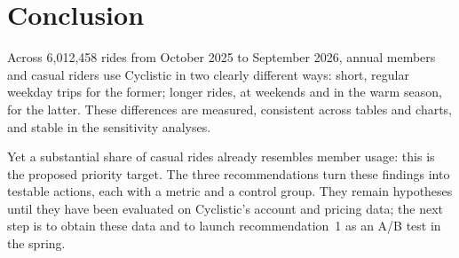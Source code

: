 \section{Conclusion}
\label{sec:conclusion}

Across 6,012,458 rides from October 2025 to September 2026, annual members and casual riders use Cyclistic in two clearly different ways: short, regular weekday trips for the former; longer rides, at weekends and in the warm season, for the latter.
These differences are measured, consistent across tables and charts, and stable in the sensitivity analyses.

Yet a substantial share of casual rides already resembles member usage: this is the proposed priority target.
The three recommendations turn these findings into testable actions, each with a metric and a control group.
They remain hypotheses until they have been evaluated on Cyclistic's account and pricing data; the next step is to obtain these data and to launch recommendation~1 as an A/B test in the spring.
